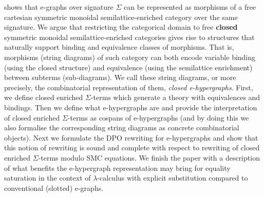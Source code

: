 \citet{tiurin2025equivalencehypergraphsdporewriting} shows that e-graphs over signature $\Sigma$ can be represented as morphisms of a free cartesian symmetric monoidal semilattice-enriched category over the same signature.
We argue that restricting the categorical domain to free \textbf{closed} symmetric monoidal semilattice-enriched categories gives rise to structures that naturally support binding and equivalence classes of morphisms.
That is, morphisms (string diagrams) of such category can both encode variable binding (using the closed structure) and equivalence (using the semilattice enrichment) between subterms (sub-diagrams).
We call these string diagrams, or more precisely, the combinatorial representation of them, \emph{closed e-hypergraphs}.
First, we define closed enriched $\Sigma$-terms which generate a theory with equivalences and bindings.
Then we define what e-hypergraphs are and provide the interpretation of closed enriched $\Sigma$-terms as cospans of e-hypergraphs (and by doing this we also formalise the corresponding string diagrams as concrete combinatorial objects).
Next we formulate the DPO rewriting for e-hypergraphs and show that this notion of rewriting is sound and complete with respect to rewriting of closed enriched $\Sigma$-terms modulo SMC equations.
We finish the paper with a description of what benefits the e-hypergraph representation may bring for equality saturation in the context of $\lambda$-calculus with explicit substitution compared to conventional (slotted) e-graphs.

